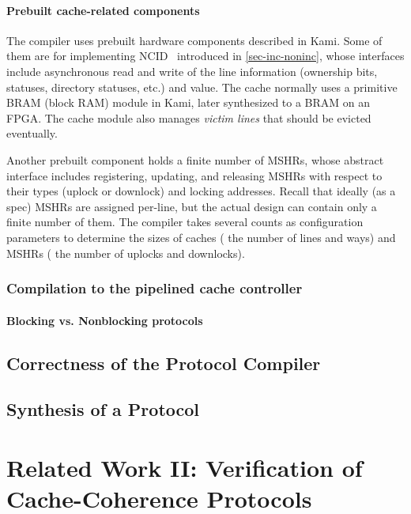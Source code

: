\subsubsection{Prebuilt cache-related components}

The compiler uses prebuilt hardware components described in Kami.
Some of them are for implementing NCID~\cite{Zhao:2010} introduced in \autoref{sec-inc-noninc}, whose interfaces include asynchronous read and write of the line information (ownership bits, statuses, directory statuses, etc.) and value.
The cache normally uses a primitive BRAM (block RAM) module in Kami, later synthesized to a BRAM on an FPGA.
The cache module also manages \emph{victim lines} that should be evicted eventually.

Another prebuilt component holds a finite number of MSHRs, whose abstract interface includes registering, updating, and releasing MSHRs with respect to their types (uplock or downlock) and locking addresses.
Recall that ideally (as a spec) MSHRs are assigned per-line, but the actual design can contain only a finite number of them.
The compiler takes several counts as configuration parameters to determine the sizes of caches (\eg{} the number of lines and ways) and MSHRs (\eg{} the number of uplocks and downlocks).

\subsection{Compilation to the pipelined cache controller}

\subsubsection{Blocking vs. Nonblocking protocols}

\section{Correctness of the Protocol Compiler}
\label{sec-compiler-correctness}

\section{Synthesis of a \hemiola{} Protocol}
\label{sec-synthesis}

\chapter{Related Work II: Verification of Cache-Coherence Protocols}
